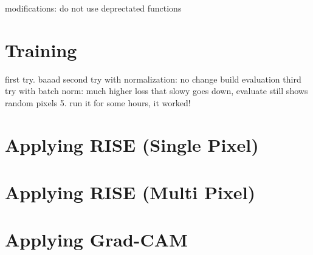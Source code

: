 modifications: do not use deprectated functions

\section{Training}

first try. baaad
second try with normalization: no change
build evaluation
third try with batch norm: much higher loss that slowy goes down, evaluate still shows random pixels
5. run it for some hours, it worked!

\section{Applying RISE (Single Pixel)}
\section{Applying RISE (Multi Pixel)}
\section{Applying Grad-CAM}
